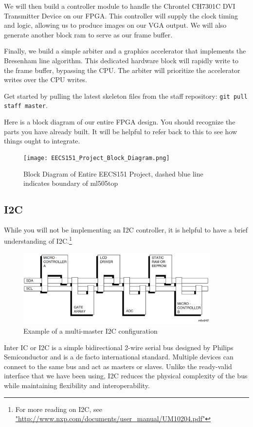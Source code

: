 \documentclass[11pt]{article}
\begin{document}
We will then build a controller module to handle the Chrontel CH7301C DVI Transmitter Device on our FPGA. This controller will supply the clock timing and logic, allowing us to produce images on our VGA output. We will also generate another block ram to serve as our frame buffer.
 
Finally, we build a simple arbiter and a graphics accelerator that implements the Bresenham line algorithm. This dedicated hardware block will rapidly write to the frame buffer, bypassing the CPU. The arbiter will prioritize the accelerator writes over the CPU writes.
 
Get started by pulling the latest skeleton files from the staff repository: \verb|git pull staff master|.

Here is a block diagram of our entire FPGA design. You should recognize the parts you have already built. It will be helpful to refer back to this to see how things ought to integrate.

\begin{figure}[H]
	\texttt{[image: EECS151\_Project\_Block\_Diagram.png]}
	\caption{Block Diagram of Entire EECS151 Project, dashed blue line indicates boundary of ml505top}
\end{figure}

\subsection{I2C}
While you will not be implementing an I2C controller, it is helpful to have a brief understanding of I2C.\footnote{For more reading on I2C, see \url{"http://www.nxp.com/documents/user_manual/UM10204.pdf"}}

\begin{figure}[hbt]
\begin{center}
	\includegraphics[width=4in]{I2C_example}
	\caption{Example of a multi-master I2C configuration}
	\label{fig:i2c_overview}
\end{center}
\end{figure}

Inter IC or I2C is a simple bidirectional 2-wire serial bus designed by Philips Semiconductor and is a de facto international standard. Multiple devices can connect to the same bus and act as masters or slaves. Unlike the ready-valid interface that we have been using, I2C  reduces the physical complexity of the bus while maintaining flexibility and interoperability. 
\end{document}

